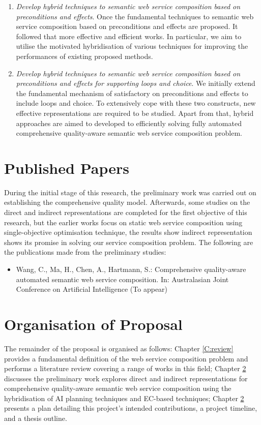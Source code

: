 \begin{enumerate}
\begin{enumerate}
  \item \emph{Develop hybrid techniques to semantic web service composition based on preconditions and effects}. Once the fundamental techniques to semantic web service composition based on preconditions and effects are proposed. It followed that more effective and efficient works. In particular, we aim to utilise the motivated hybridisation of various techniques for improving the performances of existing proposed methods.
    
   \item \emph{Develop hybrid techniques to semantic web service composition based on preconditions and effects for supporting loops and choice}. We initially extend the fundamental mechanism of satisfactory on preconditions and effects to include loops and choice. To extensively cope with these two constructs, new effective representations are required to be studied. Apart from that,  hybrid approaches are aimed to developed to efficiently solving fully automated comprehensive quality-aware semantic web service composition problem.

 
 \end{enumerate}
 
\end{enumerate}

\section{Published Papers}

During the initial stage of this research, the preliminary work was carried out on establishing the comprehensive quality model.  Afterwards, some studies on the direct and indirect representations are completed for the first objective of this research, but the earlier works focus on static web service composition using single-objective optimisation technique, the results show indirect representation shows its promise in solving our service composition problem.  The following are the publications made from the preliminary studies:

\begin{itemize}
 \item Wang, C., Ma, H., Chen, A., Hartmann, S.: Comprehensive quality-aware automated semantic web service composition. In: Australasian Joint Conference on Artificial Intelligence (To appear)
\end{itemize}


\section{Organisation of Proposal}The remainder of the proposal is organised as follows: Chapter \ref{C:review} provides a fundamental definition of the web service composition problem and performs a literature review covering a range of works in this field; Chapter \ref{} discusses the preliminary work explores direct and indirect representations for comprehensive quality-aware semantic web service composition using the hybridisation of AI planning techniques and EC-based techniques; Chapter \ref{} presents a plan detailing this project's intended contributions, a project timeline, and a thesis outline.

